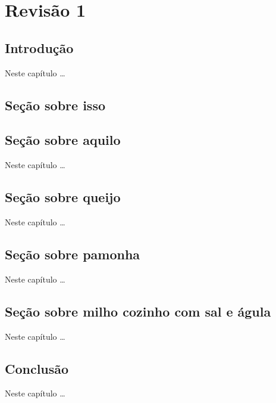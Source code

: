 \chapter{Revisão 1} \label{cap_ai}

\section{Introdução}

Neste capítulo \ldots


\section{Seção sobre isso}

\section{Seção sobre aquilo}

Neste capítulo \ldots

\section{Seção sobre queijo}

Neste capítulo \ldots

\section{Seção sobre pamonha}

Neste capítulo \ldots

\section{Seção sobre milho cozinho com sal e águla}

Neste capítulo \ldots

\section{Conclusão}

Neste capítulo \ldots

